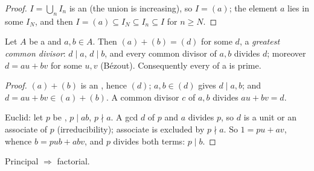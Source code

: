 \begin{proof}
$I = \bigcup_n I_n$ is an  (the union is increasing), so $I =
(a)$; the element $a$ lies in some $I_N$, and then $I = (a)
\subseteq I_N \subseteq I_n \subseteq I$ for $n \geq N$.
\end{proof}

\begin{lemma}\label{lem:b3:rings:bezout}
Let $A$ be a  and $a, b \in A$. Then $(a) + (b) = (d)$ for some
$d$, a \emph{greatest common divisor}: $d \mid a$, $d \mid b$, and every common divisor of $a,
b$ divides $d$; moreover $d = au + bv$ for some $u, v$
(B\'ezout). Consequently every  of a  is
prime.
\end{lemma}

\begin{proof}
$(a) + (b)$ is an , hence $(d)$; $a, b \in (d)$ gives $d \mid
a, b$; and $d = au + bv \in (a) + (b)$. A common divisor $c$ of
$a, b$ divides $au + bv = d$.

Euclid: let $p$ be , $p \mid ab$, $p \nmid a$. A gcd
$d$ of $p$ and $a$ divides $p$, so $d$ is a unit or an associate
of $p$ (irreducibility); associate is excluded by $p \nmid a$. So
$1 = pu + av$, whence $b = pub + abv$, and $p$ divides both terms:
$p \mid b$.
\end{proof}

\begin{theorem}\label{thm:b3:rings:pidufd}
Principal $\Rightarrow$ factorial.
\end{theorem}

